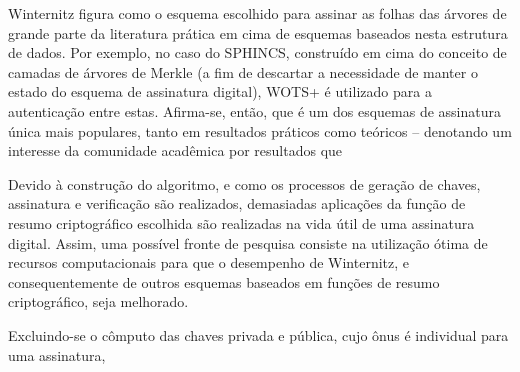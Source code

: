 \documentclass{article}
\begin{document}
Winternitz figura como o esquema escolhido para assinar as folhas das
árvores de grande parte da literatura prática em cima de esquemas baseados
nesta estrutura de dados. Por exemplo, no caso do SPHINCS, construído em
cima do conceito de camadas de árvores de Merkle (a fim de descartar a
necessidade de manter o estado do esquema de assinatura digital), WOTS+ é
utilizado para a autenticação entre estas. Afirma-se, então, que é um
dos esquemas de assinatura única mais populares, tanto em resultados
práticos como teóricos -- denotando um interesse da comunidade acadêmica
por resultados que 

Devido à construção do algoritmo, e como os processos de geração de chaves,
assinatura e verificação são realizados, demasiadas aplicações da função
de resumo criptográfico escolhida são realizadas na vida útil de uma
assinatura digital. Assim, uma possível fronte de pesquisa consiste na
utilização ótima de recursos computacionais para que o desempenho de
Winternitz, e consequentemente de outros esquemas baseados em funções de
resumo criptográfico, seja melhorado. 

Excluindo-se o cômputo das chaves privada e pública,
cujo ônus é individual para uma assinatura, 



\end{document}
